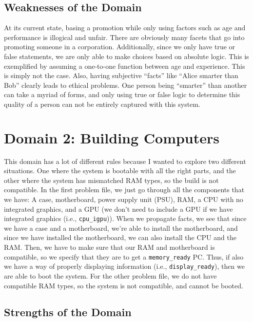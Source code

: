 \documentclass[12pt]{article}
\begin{document}
\subsection{Weaknesses of the Domain}

At its current state, basing a promotion while only using factors such as age and performance is illogical and unfair. There are obviously many facets that go into promoting someone in a corporation.  Additionally, since we only have true or false statements, we are only able to make choices based on absolute logic. This is exemplified by assuming a one-to-one function between age and experience. This is simply not the case. Also, having subjective ``facts'' like ``Alice smarter than Bob'' clearly leads to ethical problems. One person being ``smarter'' than another can take a myriad of forms, and only using true or false logic to determine this quality of a person can not be entirely captured with this system.

\section{Domain 2: Building Computers}

This domain has a lot of different rules because I wanted to explore two different situations. One where the system is bootable with all the right parts, and the other where the system has mismatched RAM types, so the build is not compatible. In the first problem file, we just go through all the components that we have: A case, motherboard, power supply unit (PSU), RAM, a CPU with no integrated graphics, and a GPU (we don't need to include a GPU if we have integrated graphics (i.e., \texttt{cpu\_igpu})). When we propagate facts, we see that since we have a case and a motherboard, we're able to install the motherboard, and since we have installed the motherboard, we can also install the CPU and the RAM. Then, we have to make sure that our RAM and motherboard is compatible, so we specify that they are to get a \texttt{memory\_ready} PC. Thus, if also we have a way of properly displaying information (i.e., \texttt{display\_ready}), then we are able to boot the system. For the other problem file, we do not have compatible RAM types, so the system is not compatible, and cannot be booted.

\subsection{Strengths of the Domain}
\end{document}
